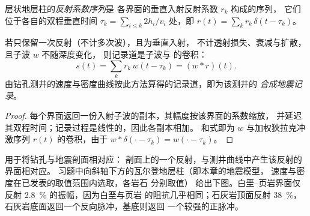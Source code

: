 \begin{definition}[反射系数序列]\label{def:b3:exploration-seismology:synthetic}
层状地层柱的\emph{反射系数序列}是
各界面的垂直入射反射系数 $r_k$ 构成的序列，
它们位于各自的双程垂直时间 $\tau_k = \sum_{i \le k} 2h_i/v_i$ 处，即
$r(t) = \sum_k r_k\,\delta(t - \tau_k)$。
\end{definition}

\begin{proposition}[卷积模型]\label{prop:b3:exploration-seismology:synthetic}
若只保留一次反射（不计多次波），且为垂直入射，
不计透射损失、衰减与扩散，且子波 $w$ 不随深度变化，
则记录道是子波与
的卷积：
\[
  s(t) = \sum_k r_k\,w(t - \tau_k) = (w*r)(t) .
\]
由钻孔测井的速度与密度曲线按此方法算得的记录道，即为该测井的
\emph{合成地震记录}。
\end{proposition}

\begin{proof}
每个界面返回一份入射子波的副本，其幅度按该界面的系数缩放，
并延迟其双程时间；记录过程是线性的，因此各副本相加。
和式即为 $w$ 与加权狄拉克冲激序列
$r(t)$ 的卷积，由于 $w*\delta(\cdot - \tau_k) = w(\cdot - \tau_k)$。
\end{proof}

用于将钻孔与地震剖面相对应：
剖面上的一个反射，与测井曲线中产生该反射的界面相对应。
习题中向斜轴下方的瓦尔登地层柱（即本章的地震模型，
速度与密度在已发表的取值范围内选取，各岩石
分别取值）
给出下图。白垩–页岩界面仅反射
\qty{2.8}{\percent} 的振幅，因为白垩与页岩
的阻抗几乎相同；石灰岩顶面反射 \qty{38}{\percent}，
石灰岩底面返回一个反向脉冲，基底则返回
一个较强的正脉冲。

